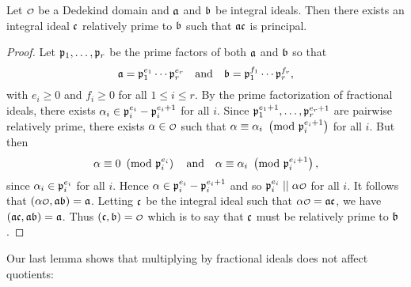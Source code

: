     \begin{lemma}\label{lem:relatively_prime_and_principal}
      Let $\smc{O}$ be a Dedekind domain and $\mathfrak{a}$ and $\mathfrak{b}$ be integral ideals. Then there exists an integral ideal $\mathfrak{c}$ relatively prime to $\mathfrak{b}$ such that $\mathfrak{a}\mathfrak{c}$ is principal.
    \end{lemma}
    \begin{proof}
      Let $\mathfrak{p}_{1},\ldots,\mathfrak{p}_{r}$ be the prime factors of both $\mathfrak{a}$ and $\mathfrak{b}$ so that
      \[
        \mathfrak{a} = \mathfrak{p}_{1}^{e_{1}} \cdots \mathfrak{p}_{r}^{e_{r}} \quad \text{and} \quad \mathfrak{b} = \mathfrak{p}_{1}^{f_{1}} \cdots \mathfrak{p}_{r}^{f_{r}},
      \]
      with $e_{i} \ge 0$ and $f_{i} \ge 0$ for all $1 \le i \le r$. By the prime factorization of fractional ideals, there exists $\alpha_{i} \in \mathfrak{p}_{i}^{e_{i}}-\mathfrak{p}_{i}^{e_{i}+1}$ for all $i$. Since $\mathfrak{p}_{1}^{e_{1}+1},\ldots,\mathfrak{p}_{r}^{e_{r}+1}$ are pairwise relatively prime, there exists $\a \in \smc{O}$ such that $\alpha \equiv \alpha_{i} \ \left(\text{mod }\mathfrak{p}_{i}^{e_{i}+1}\right)$ for all $i$. But then
      \[
        \alpha \equiv 0 \ \left(\text{mod }\mathfrak{p}_{i}^{e_{i}}\right) \quad \text{and} \quad \alpha \equiv \alpha_{i} \ \left(\text{mod }\mathfrak{p}_{i}^{e_{i}+1}\right),
      \]
      since $\alpha_{i} \in \mathfrak{p}_{i}^{e_{i}}$ for all $i$. Hence $\alpha \in \mathfrak{p}_{i}^{e_{i}}-\mathfrak{p}_{i}^{e_{i}+1}$ and so $\mf{p}_{i}^{e_{i}} \mid\mid \a\smc{O}$ for all $i$. It follows that $(\a\smc{O},\mf{a}\mf{b}) = \mf{a}$. Letting $\mathfrak{c}$ be the integral ideal such that $\a\smc{O} = \mf{a}\mf{c}$, we have $(\mathfrak{a}\mathfrak{c},\mathfrak{a}\mathfrak{b}) = \mathfrak{a}$. Thus $(\mf{c},\mf{b}) = \smc{O}$ which is to say that $\mathfrak{c}$ must be relatively prime to $\mathfrak{b}$.
    \end{proof}

    Our last lemma shows that multiplying by fractional ideals does not affect quotients:

